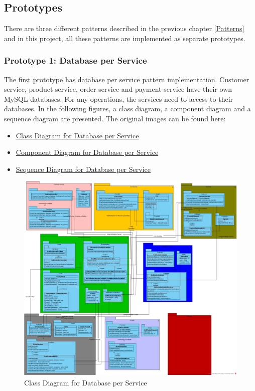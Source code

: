 \documentclass{article}
\begin{document}
\subsection{Prototypes}

There are three different patterns described in the previous chapter \ref{Patterns} and in this project, all these patterns are implemented as separate prototypes. 

\subsubsection{Prototype 1: Database per Service}

The first prototype has database per service pattern implementation. Customer service, product service, order service and payment service have their own MySQL databases. For any operations, the services need to access to their databases. In the following figures, a class diagram, a component diagram and a sequence diagram are presented. The original images can be found here: 
\begin{itemize}
    \item \href{https://github.com/eylulgokce/Microservices/blob/main/Thesis/UML%20Diagrams/Class%20Diagrams/microservices_class_diagram.jpg}{Class Diagram for Database per Service}
    \item \href{https://github.com/eylulgokce/Microservices/blob/main/Thesis/UML%20Diagrams/Component%20Diagrams/Comp_Microservice.jpg}{Component Diagram for Database per Service}
    \item \href{https://github.com/eylulgokce/Microservices/blob/main/Thesis/UML%20Diagrams/Sequence%20Diagrams/Sequence_DB.jpg}{Sequence Diagram for Database per Service}
\end{itemize}

\pagebreak

\begin{figure}[h!]
\centering
\includegraphics[scale=0.25, angle=90]{class_DB.jpg}
\caption{Class Diagram for Database per Service}
\label{fig:class_DB}
\end{figure}
\end{document}
